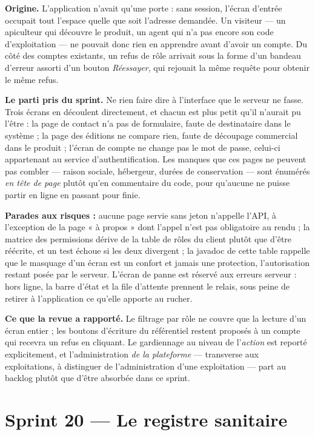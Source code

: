 \textbf{Origine.} L'application n'avait qu'une porte : sans session, l'écran
d'entrée occupait tout l'espace quelle que soit l'adresse demandée. Un visiteur
--- un apiculteur qui découvre le produit, un agent qui n'a pas encore son code
d'exploitation --- ne pouvait donc rien en apprendre avant d'avoir un compte. Du
côté des comptes existants, un refus de rôle arrivait sous la forme d'un bandeau
d'erreur assorti d'un bouton \emph{Réessayer}, qui rejouait la même requête pour
obtenir le même refus.

\textbf{Le parti pris du sprint.} Ne rien faire dire à l'interface que le serveur
ne fasse. Trois écrans en découlent directement, et chacun est plus petit qu'il
n'aurait pu l'être : la page de contact n'a pas de formulaire, faute de
destinataire dans le système ; la page des éditions ne compare rien, faute de
découpage commercial dans le produit ; l'écran de compte ne change pas le mot de
passe, celui-ci appartenant au service d'authentification. Les manques que ces
pages ne peuvent pas combler --- raison sociale, hébergeur, durées de
conservation --- sont énumérés \emph{en tête de page} plutôt qu'en commentaire du
code, pour qu'aucune ne puisse partir en ligne en passant pour finie.

\textbf{Parades aux risques :} aucune page servie sans jeton n'appelle l'API, à
l'exception de la page « à propos » dont l'appel n'est pas obligatoire au rendu ;
la matrice des permissions dérive de la table de rôles du client plutôt que d'être
réécrite, et un test échoue si les deux divergent ; la javadoc de cette table
rappelle que le masquage d'un écran est un confort et jamais une protection,
l'autorisation restant posée par le serveur. L'écran de panne est réservé aux
erreurs serveur : hors ligne, la barre d'état et la file d'attente prennent le
relais, sous peine de retirer à l'application ce qu'elle apporte au rucher.

\textbf{Ce que la revue a rapporté.} Le filtrage par rôle ne couvre que la lecture
d'un écran entier ; les boutons d'écriture du référentiel restent proposés à un
compte qui recevra un refus en cliquant. Le gardiennage au niveau de l'\emph{action}
est reporté explicitement, et l'administration \emph{de la plateforme} ---
transverse aux exploitations, à distinguer de l'administration d'une exploitation
--- part au backlog plutôt que d'être absorbée dans ce sprint.

\section{Sprint 20 --- Le registre sanitaire}

